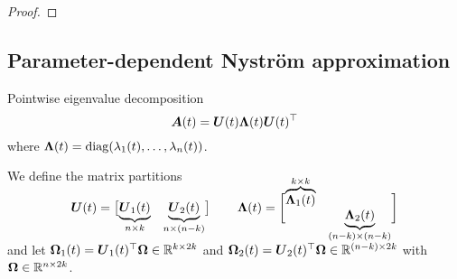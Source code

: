 \documentclass[12pt]{article}
\begin{document}
\begin{proof}

\end{proof}

\subsection{Parameter-dependent Nystr\"om approximation}
\label{subsec:nystrom}

Pointwise eigenvalue decomposition
\begin{equation}
    \boldsymbol{A}(t) 
    = \boldsymbol{U}(t) \boldsymbol{\Lambda}(t) \boldsymbol{U}(t)^{\top} 
\end{equation}
where $\boldsymbol{\Lambda}(t) = \operatorname{diag}(\lambda_1(t), \dots, \lambda_n(t))$.

We define the matrix partitions
\begin{equation}
    \rule[\dimexpr-2ex-\ht\strutbox]{0pt}{\dimexpr2ex+2ex+\baselineskip}
    \mtx{U}(t) = \begin{bmatrix}
        \smash{\underbrace{\mtx{U}_1(t)}_{n \times k}} & \smash{\underbrace{\mtx{U}_2(t)}_{n \times (n-k)}}
    \end{bmatrix}
    \qquad 
    \mtx{\Lambda}(t) =
    \begin{bmatrix}
        \smash{\overbrace{\mtx{\Lambda}_1(t)}^{k \times k}} & \\ & \smash{\underbrace{\mtx{\Lambda}_2(t)}_{(n-k) \times (n-k)}}
    \end{bmatrix}
\end{equation}
and let $\boldsymbol{\Omega}_1(t) = \boldsymbol{U}_1(t)^{\top} \boldsymbol{\Omega} \in \mathbb{R}^{k \times 2k}$ and $\boldsymbol{\Omega}_2(t) = \boldsymbol{U}_2(t)^{\top} \boldsymbol{\Omega} \in \mathbb{R}^{(n - k) \times 2k}$ with $\boldsymbol{\Omega} \in \mathbb{R}^{n \times 2k}$.
\end{document}
